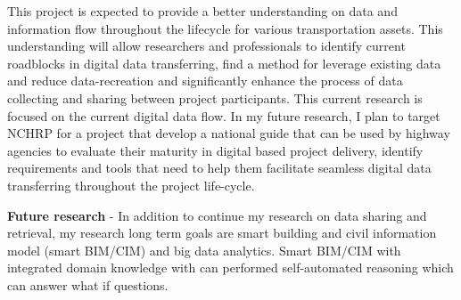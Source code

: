 \documentclass[a4paper,11pt]{article}
\begin{document}
%
%
This project is expected to provide a better understanding on data and information flow throughout the lifecycle for various transportation assets. This understanding will allow researchers and professionals to identify current roadblocks in digital data transferring, find a method for leverage existing data and reduce data-recreation and significantly enhance the process of data collecting and sharing between project participants. This current research is focused on the current digital data flow. In my future research, I plan to target NCHRP for a project that develop a national guide that can be used by highway agencies to evaluate their maturity in digital based project delivery, identify requirements and tools that need to help them facilitate seamless digital data transferring throughout the project life-cycle.  
%
%
\par
{\bf Future research} - In addition to continue my research on data sharing and retrieval, my research long term goals are smart building and civil information model (smart BIM/CIM) and big data analytics.  Smart BIM/CIM with integrated domain knowledge with can performed self-automated reasoning which can answer what if questions.
%
\end{document}
